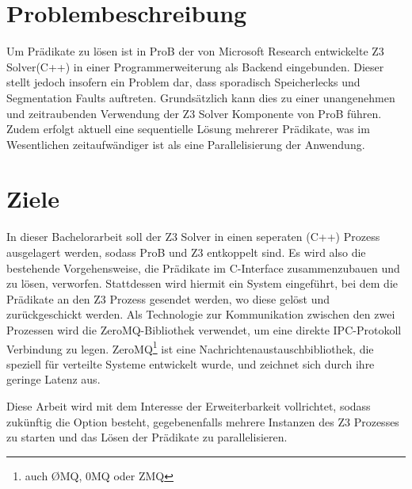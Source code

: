 \documentclass[11pt,a4paper]{scrartcl}
\begin{document}
\section{Problembeschreibung}
Um Prädikate zu lösen ist in ProB der von Microsoft Research entwickelte Z3 Solver(C++) \parencite{Z3_2} in einer Programmerweiterung als Backend eingebunden.
Dieser stellt jedoch insofern ein Problem dar, dass sporadisch Speicherlecks und Segmentation Faults auftreten.
Grundsätzlich kann dies zu einer unangenehmen und zeitraubenden Verwendung der Z3 Solver Komponente von ProB führen.
Zudem erfolgt aktuell eine sequentielle Lösung mehrerer Prädikate, was im Wesentlichen zeitaufwändiger ist als eine Parallelisierung der Anwendung.


\section{Ziele}
In dieser Bachelorarbeit soll der Z3 Solver in einen seperaten (C++) Prozess ausgelagert werden, sodass ProB und Z3 entkoppelt sind.
Es wird also die bestehende Vorgehensweise, die Prädikate im C-Interface zusammenzubauen und zu lösen, verworfen.
Stattdessen wird hiermit ein System eingeführt, bei dem die Prädikate an den Z3 Prozess gesendet werden, wo diese gelöst und zurückgeschickt werden.
Als Technologie zur Kommunikation zwischen den zwei Prozessen wird die ZeroMQ-Bibliothek \parencite{ZeroMQ_2} verwendet, um eine direkte IPC-Protokoll Verbindung zu legen.
ZeroMQ\footnote{auch ØMQ, 0MQ oder ZMQ} ist eine Nachrichtenaustauschbibliothek, die speziell für verteilte Systeme entwickelt wurde, und zeichnet sich durch ihre geringe Latenz aus.

Diese Arbeit wird mit dem Interesse der Erweiterbarkeit vollrichtet, sodass zukünftig die Option besteht, gegebenenfalls mehrere Instanzen des Z3 Prozesses zu starten und
das Lösen der Prädikate zu parallelisieren.
\end{document}
